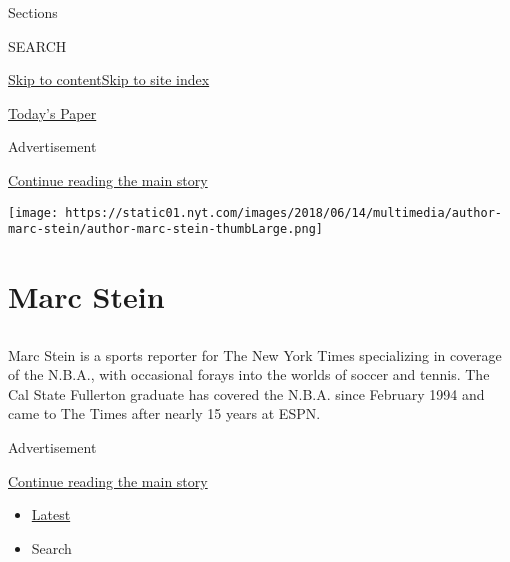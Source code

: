 Sections

SEARCH

\protect\hyperlink{site-content}{Skip to
content}\protect\hyperlink{site-index}{Skip to site index}

\href{https://myaccount.nytimes.com/auth/login?response_type=cookie\&client_id=vi}{}

\href{https://www.nytimes.com/section/todayspaper}{Today's Paper}

Advertisement

\protect\hyperlink{after-top}{Continue reading the main story}

\texttt{[image: https://static01.nyt.com/images/2018/06/14/multimedia/author-marc-stein/author-marc-stein-thumbLarge.png]}

\hypertarget{marc-stein}{%
\section{Marc Stein}\label{marc-stein}}

\subsection{}

Marc Stein is a sports reporter for The New York Times specializing in
coverage of the N.B.A., with occasional forays into the worlds of soccer
and tennis. The Cal State Fullerton graduate has covered the N.B.A.
since February 1994 and came to The Times after nearly 15 years at ESPN.

Advertisement

\protect\hyperlink{after-mid1}{Continue reading the main story}

\begin{itemize}
\tightlist
\item
  \protect\hyperlink{stream-panel}{Latest}
\item
  Search
\end{itemize}

